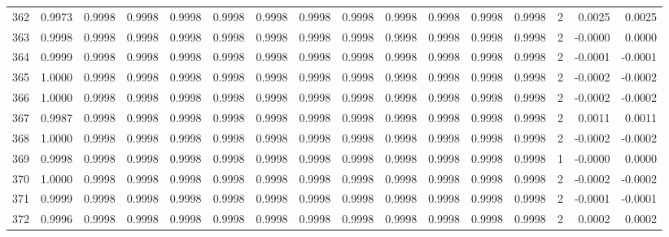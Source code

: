 \begin{tabular}{lrrrrrrrrrrrrrrr}
362 &      0.9973 &  0.9998 &  0.9998 &  0.9998 &  0.9998 &  0.9998 &  0.9998 &  0.9998 &  0.9998 &  0.9998 &   0.9998 &     0.9998 &      2 &                    0.0025 &                     0.0025 \\
363 &      0.9998 &  0.9998 &  0.9998 &  0.9998 &  0.9998 &  0.9998 &  0.9998 &  0.9998 &  0.9998 &  0.9998 &   0.9998 &     0.9998 &      2 &                   -0.0000 &                     0.0000 \\
364 &      0.9999 &  0.9998 &  0.9998 &  0.9998 &  0.9998 &  0.9998 &  0.9998 &  0.9998 &  0.9998 &  0.9998 &   0.9998 &     0.9998 &      2 &                   -0.0001 &                    -0.0001 \\
365 &      1.0000 &  0.9998 &  0.9998 &  0.9998 &  0.9998 &  0.9998 &  0.9998 &  0.9998 &  0.9998 &  0.9998 &   0.9998 &     0.9998 &      2 &                   -0.0002 &                    -0.0002 \\
366 &      1.0000 &  0.9998 &  0.9998 &  0.9998 &  0.9998 &  0.9998 &  0.9998 &  0.9998 &  0.9998 &  0.9998 &   0.9998 &     0.9998 &      2 &                   -0.0002 &                    -0.0002 \\
367 &      0.9987 &  0.9998 &  0.9998 &  0.9998 &  0.9998 &  0.9998 &  0.9998 &  0.9998 &  0.9998 &  0.9998 &   0.9998 &     0.9998 &      2 &                    0.0011 &                     0.0011 \\
368 &      1.0000 &  0.9998 &  0.9998 &  0.9998 &  0.9998 &  0.9998 &  0.9998 &  0.9998 &  0.9998 &  0.9998 &   0.9998 &     0.9998 &      2 &                   -0.0002 &                    -0.0002 \\
369 &      0.9998 &  0.9998 &  0.9998 &  0.9998 &  0.9998 &  0.9998 &  0.9998 &  0.9998 &  0.9998 &  0.9998 &   0.9998 &     0.9998 &      1 &                   -0.0000 &                     0.0000 \\
370 &      1.0000 &  0.9998 &  0.9998 &  0.9998 &  0.9998 &  0.9998 &  0.9998 &  0.9998 &  0.9998 &  0.9998 &   0.9998 &     0.9998 &      2 &                   -0.0002 &                    -0.0002 \\
371 &      0.9999 &  0.9998 &  0.9998 &  0.9998 &  0.9998 &  0.9998 &  0.9998 &  0.9998 &  0.9998 &  0.9998 &   0.9998 &     0.9998 &      2 &                   -0.0001 &                    -0.0001 \\
372 &      0.9996 &  0.9998 &  0.9998 &  0.9998 &  0.9998 &  0.9998 &  0.9998 &  0.9998 &  0.9998 &  0.9998 &   0.9998 &     0.9998 &      2 &                    0.0002 &                     0.0002 \\

\end{tabular}

